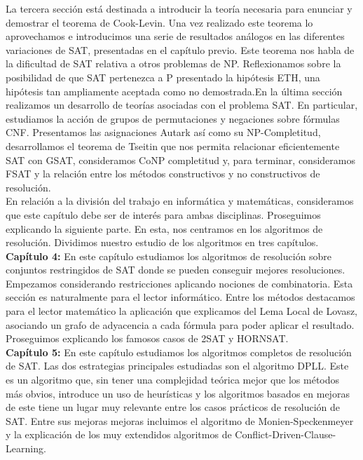 La tercera sección está destinada a introducir la teoría necesaria para enunciar y demostrar el teorema de Cook-Levin. Una vez realizado este teorema lo aprovechamos e  introducimos una serie de resultados análogos en las diferentes variaciones de SAT, presentadas en el capítulo previo. Este teorema nos habla de la dificultad de SAT relativa a otros problemas de NP. Reflexionamos sobre la posibilidad de que SAT pertenezca a P presentado la hipótesis ETH, una hipótesis tan ampliamente aceptada como no demostrada.En la última sección realizamos un desarrollo de teorías asociadas con el problema SAT. En particular, estudiamos la acción de grupos de permutaciones y negaciones sobre fórmulas CNF. Presentamos las asignaciones Autark así como su NP-Completitud,  desarrollamos el teorema de Tseitin que nos permita relacionar eficientemente SAT con GSAT, consideramos CoNP completitud y, para terminar, consideramos FSAT y la relación entre los métodos constructivos y no constructivos de resolución.\\

En relación a la división del trabajo en informática y matemáticas, consideramos que este capítulo debe ser de interés para ambas disciplinas. Proseguimos explicando la siguiente parte. En esta, nos centramos en los algoritmos de resolución. Dividimos nuestro estudio de los algoritmos en tres capítulos.\\


\textbf{Capítulo 4:} En este capítulo estudiamos los algoritmos de resolución sobre conjuntos restringidos de SAT donde se pueden conseguir mejores resoluciones. Empezamos considerando restricciones aplicando nociones de combinatoria. Esta sección es naturalmente para el lector informático. Entre los métodos destacamos para el lector matemático la aplicación que explicamos del Lema Local de Lovasz, asociando un grafo de adyacencia a cada fórmula para poder aplicar el resultado. Proseguimos explicando los famosos casos de 2SAT y HORNSAT. \\

\textbf{Capítulo 5:} En este capítulo estudiamos los algoritmos completos de resolución de SAT. Las dos estrategias principales estudiadas son el algoritmo DPLL. Este es un algoritmo que, sin tener una complejidad teórica mejor que los métodos más obvios, introduce un uso de heurísticas y los algoritmos basados en mejoras de este tiene un lugar muy relevante entre los casos prácticos de resolución de SAT. Entre sus mejoras mejoras incluimos el algoritmo de Monien-Speckenmeyer y la explicación de los muy extendidos algoritmos de Conflict-Driven-Clause-Learning.\\

